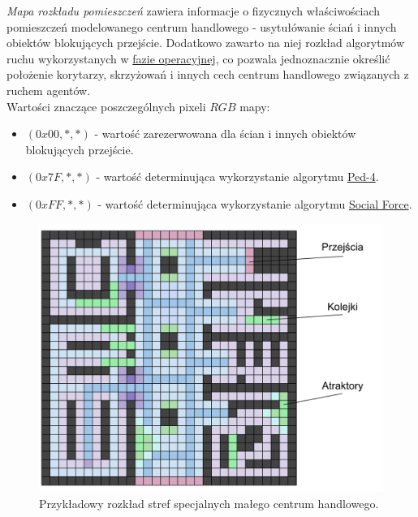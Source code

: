 \documentclass[a4paper, 12pt]{article}
\begin{document}
        \emph{Mapa rozkładu pomieszczeń} zawiera informacje o fizycznych właściwościach pomieszczeń modelowanego centrum handlowego - usytułówanie ściań i innych obiektów blokujących przejście. Dodatkowo zawarto na niej rozkład algorytmów ruchu wykorzystanych w \hyperref[sec:operational]{fazie operacyjnej}, co pozwala jednoznacznie określić położenie korytarzy, skrzyżowań i innych cech centrum handlowego związanych z ruchem agentów. \\

\noindent
Wartości znaczące poszczególnych pixeli $RGB$ mapy:

        \begin{itemize}
            \item $(0x00, *, *)$ - wartość zarezerwowana dla ścian i innych obiektów blokujących przejście.
            \item $(0x7F, *, *)$ - wartość determinująca wykorzystanie algorytmu \hyperref[sec:movement-impl]{Ped-4}.
            \item $(0xFF, *, *)$ - wartość determinująca wykorzystanie algorytmu \hyperref[sec:social-force-impl]{Social Force}.
        \end{itemize}

        \begin{figure}[H]
            \centering
            \includegraphics[scale=0.3]{./img/MallFeatures.pdf}
            \caption{Przykładowy rozkład stref specjalnych małego centrum handlowego.}
            \label{fig:mall-features}
        \end{figure}
\end{document}
